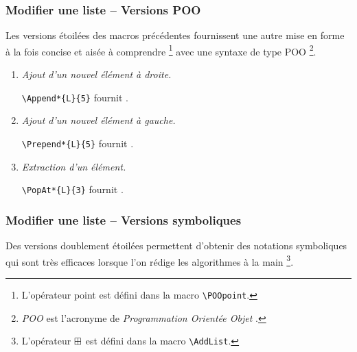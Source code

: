 \documentclass[12pt,a4paper]{article}
\theoremstyle{definition}
\newcommand\myquote[1]{{\itshape \og #1 \fg}}
\begin{document}
\subsubsection{Modifier une liste -- Versions POO}

Les versions étoilées des macros précédentes fournissent une autre mise en forme à la fois concise et aisée à comprendre
\footnote{
	L'opérateur point \POOpoint{} est défini dans la macro \texttt{\textbackslash{}POOpoint}.
}
avec une syntaxe de type POO
\footnote{
	\myquote{POO} est l'acronyme de \myquote{Programmation Orientée Objet}.
}.


\begin{enumerate}
	\item \textit{Ajout d'un nouvel élément à droite.}

	      \verb++ fournit \Append*{L}{5}.


	\item \textit{Ajout d'un nouvel élément à gauche.}

	      \verb++ fournit \Prepend*{L}{5}.


	\item \textit{Extraction d'un élément.}

	      \verb++ fournit \PopAt*{L}{3}.
\end{enumerate}



\subsubsection{Modifier une liste -- Versions symboliques}

Des versions doublement étoilées permettent d'obtenir des notations symboliques qui sont très efficaces lorsque l'on rédige les algorithmes à la main
\footnote{
	L'opérateur $\mathbin{\boxplus}$ est défini dans la macro \texttt{\textbackslash{}AddList}.
}.
\end{document}
